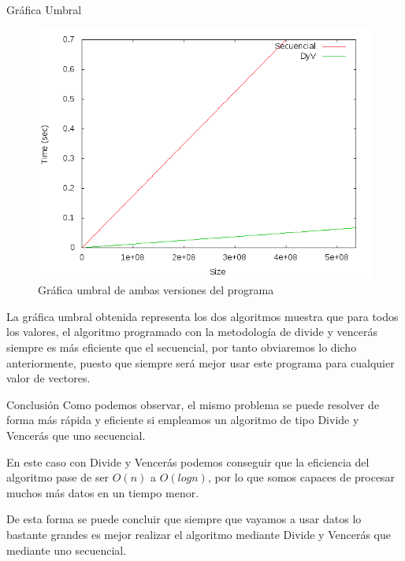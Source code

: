 \documentclass[12pt]{beamer}
\begin{document}
\begin{frame}{Gráfica Umbral}

\begin{figure}[H] 
\centering
\includegraphics[angle=0,scale=0.5]{img/umbral.png} 
\caption{Gráfica umbral de ambas versiones del programa} 
\end{figure}
 
\end{frame}

\begin{frame}{}

La gráfica umbral obtenida representa los dos algoritmos muestra que para todos los valores, el algoritmo programado con la metodología de divide y vencerás siempre es más eficiente que el secuencial, por tanto obviaremos lo dicho anteriormente, puesto que siempre será mejor usar este programa para cualquier valor de vectores.
 
\end{frame}

\begin{frame}{Conclusión}
Como podemos observar, el mismo problema se puede resolver de forma más rápida y eficiente si empleamos un algoritmo de tipo Divide y Vencerás que uno secuencial.

\vspace{5mm} %

En este caso con Divide y Vencerás podemos conseguir que la eficiencia del algoritmo pase de ser $O(n)$ a $O(log n)$, por lo que somos capaces de procesar muchos más datos en un tiempo menor. 

\vspace{5mm} %

De esta forma se puede concluir que siempre que vayamos a usar datos lo bastante grandes es mejor realizar el algoritmo mediante Divide y Vencerás que mediante uno secuencial. 
\end{frame}
\end{document}
